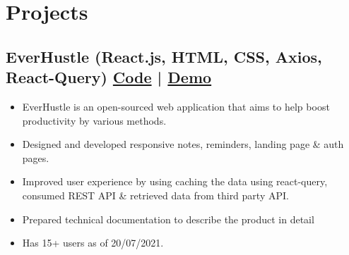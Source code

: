 \documentclass[a4,10pt]{article}
\newenvironment{zitemize}{
\begin{itemize}\itemsep0pt \parskip0pt \parsep1pt}
{\end{itemize}\vspace{-0.5cm}}
\begin{document}
\section{Projects} %





\subsection*{EverHustle {\normalsize\normalfont (React.js, HTML, CSS, Axios, React-Query)} \hfill {\href{https://github.com/DevelopersLeague/EverHustle-FrontEnd}{Code} } | {\href{https://everhustle.netlify.app/}{Demo} }} 
    \begin{zitemize}
        \item EverHustle is an open-sourced web application that aims to help boost productivity by various methods. 
        \item Designed and developed responsive notes, reminders, landing page \& auth pages.
        \item Improved user experience by using caching the data using react-query, consumed REST API \& retrieved data
        from third party API.
        \item Prepared technical documentation to describe the product in detail
        \item Has 15+ users as of 20/07/2021.
    \end{zitemize}
\end{document}
